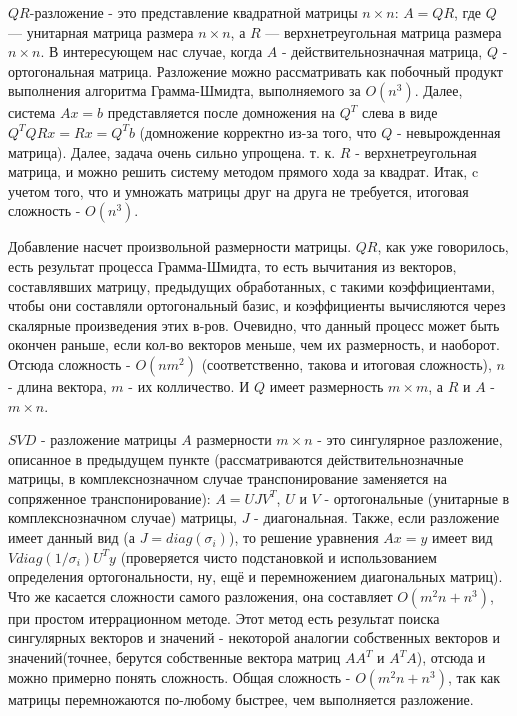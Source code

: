 \documentclass{article}
\begin{document}
$QR$-разложение - это представление квадратной матрицы  $ n\times n$: $A = QR$, где  $Q$ — унитарная матрица размера $ n\times n$, а  $R$ — верхнетреугольная матрица размера $ n\times n$. В интересующем нас случае, когда $A$ - действительнозначная матрица, $Q$ - ортогональная матрица. Разложение можно рассматривать как побочный продукт выполнения алгоритма Грамма-Шмидта, выполняемого за $O(n^3)$. Далее, система $Ax = b$ представляется после домножения на $Q^T$ слева в виде $Q^TQRx = Rx =Q^Tb$ (домножение корректно из-за того, что $Q$ - невырожденная матрица). Далее, задача очень сильно упрощена. т. к. $R$ - верхнетреугольная матрица, и можно решить систему методом прямого хода за квадрат. Итак, c учетом того, что и умножать матрицы друг на друга не требуется, итоговая сложность - $ O(n^3)$.

Добавление насчет произвольной размерности матрицы. $QR$, как уже говорилось, есть результат процесса Грамма-Шмидта, то есть вычитания из векторов, составлявших матрицу, предыдущих обработанных, с такими коэффициентами, чтобы они составляли ортогональный базис, и коэффициенты вычисляются через скалярные произведения этих в-ров. Очевидно, что данный процесс может быть окончен раньше, если кол-во векторов меньше, чем их размерность, и наоборот. Отсюда сложность - $O(nm^2)$ (соответственно, такова и итоговая сложность), $n$ - длина вектора, $m$ - их колличество. И $Q$ имеет размерность $m\times m$, а $R$ и $A$ - $m \times n$.

 $SVD$ - разложение матрицы $A$ размерности $m \times n$ - это сингулярное разложение, описанное в предыдущем пункте (рассматриваются действительнозначные матрицы, в комплекснозначном случае транспонирование заменяется на сопряженное транспонирование): $A = UJV^T$, $U$ и $V$ - ортогональные (унитарные в комплекснозначном случае) матрицы, $J$ - диагональная. Также, если разложение имеет данный вид (а $J = diag(\sigma_i) $), то решение уравнения $Ax = y$ имеет вид $Vdiag(1/\sigma_i)U^Ty$ (проверяется чисто подстановкой и использованием определения ортогональности, ну, ещё и перемножением диагональных матриц). Что же касается сложности самого разложения, она составляет $O(m^2n + n^3)$, при простом итеррационном методе. Этот метод есть результат поиска сингулярных векторов и значений - некоторой аналогии собственных векторов и значений(точнее, берутся собственные вектора матриц $AA^T$ и $A^TA$), отсюда и можно примерно понять сложность. Общая сложность - $ O(m^2n + n^3)$, так как матрицы перемножаются по-любому быстрее, чем выполняется разложение. 
 
\end{document}
